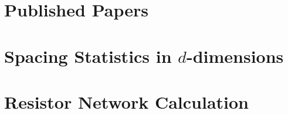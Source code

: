 \chapter{Published Papers}\label{sec:papers}


\chapter{Spacing Statistics in $d$-dimensions}



\chapter{Resistor Network Calculation}




